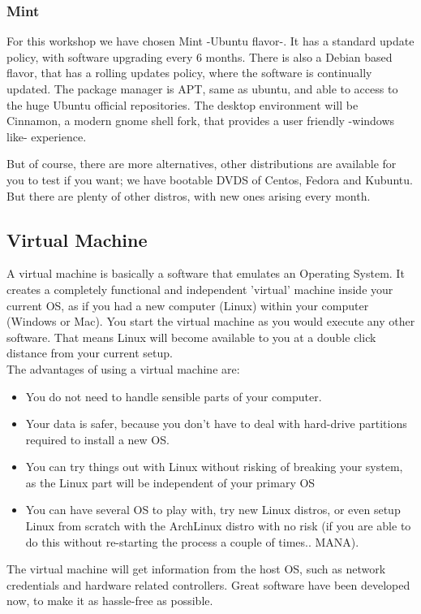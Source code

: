 \documentclass[a4paper]{article}
\begin{document}
\subsubsection{Mint}
For this workshop we have chosen Mint -Ubuntu flavor-. It has a standard update policy, with software upgrading every 6 months. There is also a Debian based flavor, that has a rolling updates policy, where the software is continually updated. The package manager is APT, same as ubuntu, and able to access to the huge Ubuntu official repositories. The desktop environment will be Cinnamon, a modern gnome shell fork, that provides a user friendly -windows like- experience.

But of course, there are more alternatives, other distributions are available for you to test if you want; we have bootable DVDS of Centos, Fedora and Kubuntu. But there are plenty of other distros, with new ones arising every month.
\subsection{Virtual Machine}
A virtual machine is basically a software that emulates an Operating System. It creates a completely functional and independent 'virtual' machine inside your current OS, as if you had a new computer (Linux) within your computer (Windows or Mac). You start the virtual machine as you would execute any other software. That means Linux will become available to you at a double click distance from your current setup. \\
The advantages of using a virtual machine are:
\begin{itemize}
\item You do not need to handle sensible parts of your computer.
\item Your data is safer, because you don't have to deal with hard-drive partitions required to install a new OS.
\item You can try things out with Linux without risking of breaking your system, as the Linux part will be independent of your primary OS
\item You can have several OS to play with, try new Linux distros, or even setup Linux from scratch with the ArchLinux distro with no risk (if you are able to do this without re-starting the process a couple of times.. MANA).
\end{itemize}

The virtual machine will get information from the host OS, such as network credentials and hardware related controllers. Great software have been developed now, to make it as hassle-free as possible.\\
\end{document}
